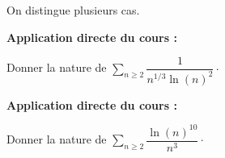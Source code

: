 \documentclass[french,11pt,twoside]{VcCours}
\newenvironment{ApplicationDirecte}{\textbf{Application directe du cours :}

}{}
\newcommand{\Sum}[2]{\ensuremath{\textstyle{\sum\limits_{#1}^{#2}}}}
\begin{document}
\begin{Demonstration}{} On distingue plusieurs cas.

\vspace*{15cm}

\end{Demonstration}




\begin{ApplicationDirecte} Donner la nature de $\Sum{n \geq 2}{} \dfrac{1}{n^{1/3} \ln(n)^2} \cdot$
\end{ApplicationDirecte} 

\begin{ApplicationDirecte} Donner la nature de $\Sum{n \geq 2}{} \dfrac{\ln(n)^{10}}{n^{3}} \cdot$
\end{ApplicationDirecte} 
\end{document}
